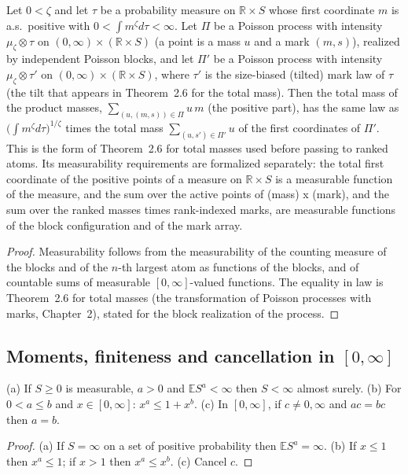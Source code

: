 \begin{lemma}\label{lem:sg:marked-tilt}
  \leanok
Let $0<\zeta$ and let $\tau$ be a probability measure on $\mathbb R\times S$ whose first coordinate $m$ is a.s.\ positive with $0<\int m^\zeta d\tau<\infty$.
Let $\Pi$ be a Poisson process with intensity $\mu_\zeta\otimes\tau$ on $(0,\infty)\times(\mathbb R\times S)$ (a point is a mass $u$ and a mark $(m,s)$), realized by
independent Poisson blocks, and let $\Pi'$ be a Poisson process with intensity $\mu_\zeta\otimes\tau'$ on $(0,\infty)\times(\mathbb R\times S)$, where $\tau'$ is the size-biased (tilted)
mark law of $\tau$ (the tilt that appears in Theorem~2.6 for the total mass). Then the total mass of the product masses,
$\sum_{(u,(m,s))\in\Pi}u\,m$ (the positive part), has the same law as
$\big(\int m^\zeta d\tau\big)^{1/\zeta}$ times the total mass $\sum_{(u,s')\in\Pi'}u$ of the first coordinates of $\Pi'$.
This is the form of Theorem~2.6 for total masses used before passing to ranked atoms.
Its measurability requirements are formalized separately: the total first coordinate of the positive points of a measure on $\mathbb R\times S$ is a measurable function of the
measure, and the sum over the active points of (mass) x (mark), and the sum over the ranked masses times rank-indexed marks, are measurable functions of the block
configuration and of the mark array.
\end{lemma}
\begin{proof}
  \leanok
Measurability follows from the measurability of the counting measure of the blocks and of the $n$-th largest atom as functions of the blocks,
and of countable sums of measurable $[0,\infty]$-valued functions. The equality in law is Theorem~2.6 for total masses (the transformation of Poisson processes with marks, Chapter~2), stated for the block realization of the process.
\end{proof}

\subsection*{Moments, finiteness and cancellation in $[0,\infty]$}

\begin{lemma}\label{lem:sg:moment-facts}
  \leanok
(a) If $S\ge0$ is measurable, $a>0$ and $\mathbb E S^a<\infty$ then $S<\infty$ almost surely.
(b) For $0<a\le b$ and $x\in[0,\infty]$: $x^a\le1+x^b$.
(c) In $[0,\infty]$, if $c\ne0,\infty$ and $ac=bc$ then $a=b$.
\end{lemma}
\begin{proof}
  \leanok
(a) If $S=\infty$ on a set of positive probability then $\mathbb E S^a=\infty$. (b) If $x\le1$ then $x^a\le1$; if $x>1$ then $x^a\le x^b$. (c) Cancel $c$.
\end{proof}

